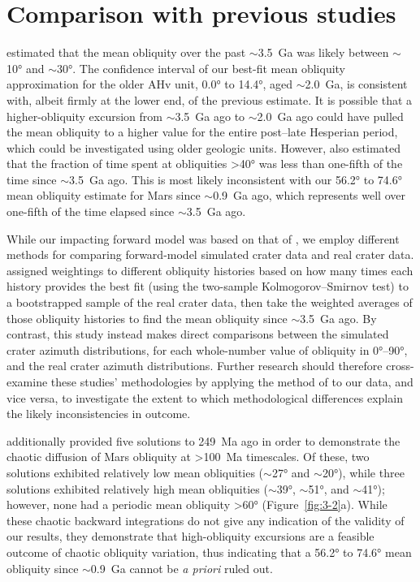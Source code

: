 \documentclass{ucetd}
\begin{document}
\section{Comparison with previous studies}
\label{section:4-2}

\citet{holo2018a} estimated that the mean obliquity over the past $\sim$3.5~Ga was likely between $\sim$10° and $\sim$30°. The confidence interval of our best-fit mean obliquity approximation for the older AHv unit, 0.0° to 14.4°, aged $\sim$2.0~Ga, is consistent with, albeit firmly at the lower end, of the previous estimate. It is possible that a higher-obliquity excursion from $\sim$3.5~Ga ago to $\sim$2.0~Ga ago could have pulled the mean obliquity to a higher value for the entire post--late Hesperian period, which could be investigated using older geologic units. However, \citeauthor{holo2018a} also estimated that the fraction of time spent at obliquities >40° was less than one-fifth of the time since $\sim$3.5~Ga ago. This is most likely inconsistent with our 56.2° to 74.6° mean obliquity estimate for Mars since $\sim$0.9~Ga ago, which represents well over one-fifth of the time elapsed since $\sim$3.5~Ga ago.

While our impacting forward model was based on that of \citet{holo2018a}, we employ different methods for comparing forward-model simulated crater data and real crater data. \citeauthor{holo2018a} assigned weightings to different obliquity histories based on how many times each history provides the best fit (using the two-sample Kolmogorov--Smirnov test) to a bootstrapped sample of the real crater data, then take the weighted averages of those obliquity histories to find the mean obliquity since $\sim$3.5~Ga ago. By contrast, this study instead makes direct comparisons between the simulated crater azimuth distributions, for each whole-number value of obliquity in 0°--90°, and the real crater azimuth distributions. Further research should therefore cross-examine these studies’ methodologies by applying the method of \citet{holo2018a} to our data, and vice versa, to investigate the extent to which methodological differences explain the likely inconsistencies in outcome.

\citet{laskar2010a} additionally provided five solutions to 249~Ma ago in order to demonstrate the chaotic diffusion of Mars obliquity at >100~Ma timescales. Of these, two solutions exhibited relatively low mean obliquities ($\sim$27° and $\sim$20°), while three solutions exhibited relatively high mean obliquities ($\sim$39°, $\sim$51°, and $\sim$41°); however, none had a periodic mean obliquity >60° (Figure~\ref{fig:3-2}a). While these chaotic backward integrations do not give any indication of the validity of our results, they demonstrate that high-obliquity excursions are a feasible outcome of chaotic obliquity variation, thus indicating that a 56.2° to 74.6° mean obliquity since $\sim$0.9~Ga cannot be \textit{a priori} ruled out.
\end{document}
